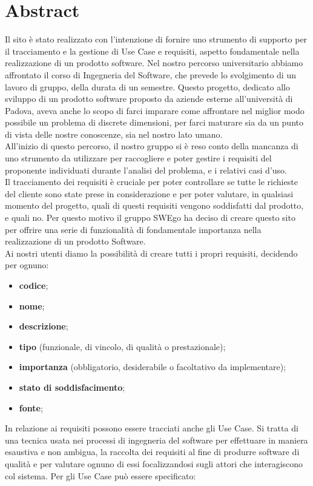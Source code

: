 \section{Abstract}
Il sito è stato realizzato con l'intenzione di fornire uno strumento di supporto per il tracciamento e la gestione di Use Case e requisiti, aspetto fondamentale nella realizzazione di un prodotto software.
Nel nostro percorso universitario abbiamo affrontato il corso di Ingegneria del Software, che prevede lo svolgimento di un lavoro di gruppo, della durata di un semestre. Questo progetto, dedicato allo sviluppo di un prodotto software proposto da aziende esterne all'università di Padova, aveva anche lo scopo di farci imparare come affrontare nel miglior modo possibile un problema di discrete dimensioni, per farci maturare sia da un punto di vista delle nostre conoscenze, sia nel nostro lato umano. \\
All'inizio di questo percorso, il nostro gruppo si è reso conto della mancanza di uno strumento da utilizzare per raccogliere e poter gestire i requisiti del proponente individuati durante l'analisi del problema, e i relativi casi d'uso. \\
Il tracciamento dei requisiti è cruciale per poter controllare se tutte le richieste del cliente sono state prese in considerazione e per poter valutare, in qualsiasi momento del progetto, quali di questi requisiti vengono soddisfatti dal prodotto, e quali no. Per questo motivo il gruppo SWEgo ha deciso di creare questo sito per offrire una serie di funzionalità di fondamentale importanza nella realizzazione di un prodotto Software. \\
Ai nostri utenti diamo la possibilità di creare tutti i propri requisiti, decidendo per ognuno:
\begin{itemize}
	\item \textbf{codice};
	\item \textbf{nome};
	\item \textbf{descrizione};
	\item \textbf{tipo} (funzionale, di vincolo, di qualità o prestazionale);
	\item \textbf{importanza} (obbligatorio, desiderabile o facoltativo da implementare);
	\item \textbf{stato di soddisfacimento};
	\item \textbf{fonte};
\end{itemize}
In relazione ai requisiti possono essere tracciati anche gli Use Case. Si tratta di una tecnica usata nei processi di ingegneria del software per effettuare in maniera esaustiva e non ambigua, la raccolta dei requisiti al fine di produrre software di qualità e per valutare ognuno di essi focalizzandosi sugli attori che interagiscono col sistema. Per gli Use Case può essere specificato:
